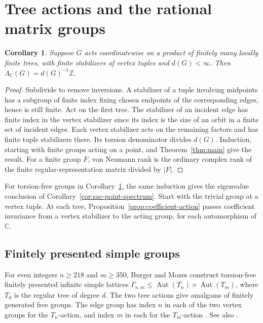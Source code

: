 \documentclass[11pt,a4paper,reqno]{amsart}
\numberwithin{equation}{section}
\newtheorem{corollary}[theorem]{Corollary}
\theoremstyle{remark}
\newcommand{\C}{\mathbb C}
\newcommand{\Z}{\mathbb Z}
\newcommand{\Aut}{\operatorname{Aut}}
\begin{document}
\section{Tree actions and the rational matrix groups}
\begin{corollary}\label{cor:trees}
Suppose \(G\) acts coordinatewise on a product of finitely many locally finite trees, with finite stabilizers of vertex tuples and \(d(G)<\infty\). Then \(\Lambda_{\C}(G)=d(G)^{-1}\Z\).
\end{corollary}
\begin{proof}
Subdivide to remove inversions. A stabilizer of a tuple involving midpoints has a subgroup of finite index fixing chosen endpoints of the corresponding edges, hence is still finite. Act on the first tree. The stabilizer of an incident edge has finite index in the vertex stabilizer since its index is the size of an orbit in a finite set of incident edges. Each vertex stabilizer acts on the remaining factors and has finite tuple stabilizers there. Its torsion denominator divides \(d(G)\). Induction, starting with finite groups acting on a point, and Theorem~\ref{thm:main} give the result. For a finite group \(F\), von Neumann rank is the ordinary complex rank of the finite regular-representation matrix divided by \(|F|\).
\end{proof}

For torsion-free groups in Corollary~\ref{cor:trees}, the same induction gives the eigenvalue conclusion of Corollary~\ref{cor:sac-point-spectrum}. Start with the trivial group at a vertex tuple. At each tree, Proposition~\ref{prop:coefficient-action} passes coefficient invariance from a vertex stabilizer to the acting group, for each automorphism of \(\C\).

\subsection{Finitely presented simple groups}\label{sec:sac-simple}

For even integers \(n\geq218\) and \(m\geq350\), Burger and Mozes construct
torsion-free finitely presented infinite simple lattices
\(\Gamma_{n,m}\leq\Aut(T_n)\times\Aut(T_m)\), where \(T_d\) is the regular
tree of degree \(d\). The two tree actions give amalgams of finitely
generated free groups. The edge group has index \(n\) in each of the two
vertex groups for the \(T_n\)-action, and index \(m\) in each for the
\(T_m\)-action \cite[the theorem and Remark~(3) in \S0, and \S1]{BMSimple}.
See also \cite[Theorem~5.5]{BM}.
\end{document}
